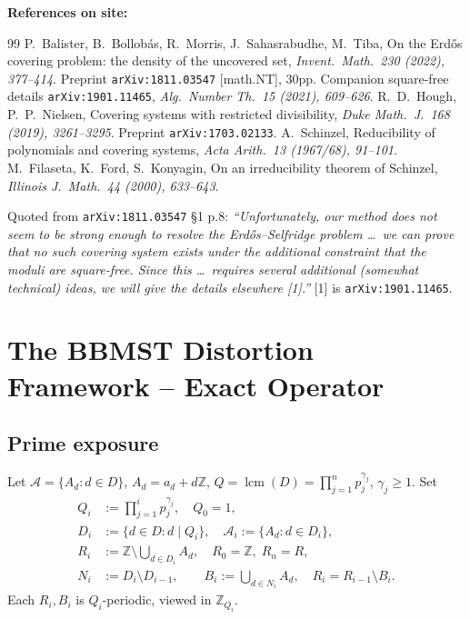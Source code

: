 \documentclass[11pt,a4paper]{article}
\theoremstyle{plain}
\theoremstyle{definition}
\theoremstyle{remark}
\newcommand{\Z}{\mathbb{Z}}
\newcommand{\calA}{\mathcal{A}}
\begin{document}
\noindent\textbf{References on site:}
\begin{thebibliography}{99}
 P.~Balister, B.~Bollob\'as, R.~Morris, J.~Sahasrabudhe, M.~Tiba, On the Erd\H{o}s covering problem: the density of the uncovered set, \textit{Invent.\ Math.\ 230 (2022), 377--414}. Preprint \texttt{arXiv:1811.03547} [math.NT], 30pp. Companion square-free details \texttt{arXiv:1901.11465}, \textit{Alg.\ Number Th.\ 15 (2021), 609--626}.
 R.~D.~Hough, P.~P.~Nielsen, Covering systems with restricted divisibility, \textit{Duke Math.\ J.\ 168 (2019), 3261--3295}. Preprint \texttt{arXiv:1703.02133}.
 A.~Schinzel, Reducibility of polynomials and covering systems, \textit{Acta Arith.\ 13 (1967/68), 91--101}.
 M.~Filaseta, K.~Ford, S.~Konyagin, On an irreducibility theorem of Schinzel, \textit{Illinois J.\ Math.\ 44 (2000), 633--643}.
\end{thebibliography}

Quoted from \texttt{arXiv:1811.03547} \S1 p.8: \emph{``Unfortunately, our method does not seem to be strong enough to resolve the Erd\H{o}s--Selfridge problem \dots\ we can prove that no such covering system exists under the additional constraint that the moduli are square-free. Since this \dots\ requires several additional (somewhat technical) ideas, we will give the details elsewhere [1].''}  [1] is \texttt{arXiv:1901.11465}.

\section{The BBMST Distortion Framework -- Exact Operator}

\subsection{Prime exposure}

Let $\calA=\{A_{d}:d\in D\}$, $A_{d}=a_{d}+d\Z$, $Q=\operatorname{lcm}(D)=\prod_{j=1}^{n}p_{j}^{\gamma_{j}}$, $\gamma_{j}\ge1$. Set
\begin{align*}
Q_{i}&:=\prod_{j=1}^{i}p_{j}^{\gamma_{j}},\quad Q_{0}=1,\\
D_{i}&:=\{d\in D:d\mid Q_{i}\},\quad \calA_{i}:=\{A_{d}:d\in D_{i}\},\\
R_{i}&:=\Z\setminus\bigcup_{d\in D_{i}}A_{d},\quad R_{0}=\Z,\;R_{n}=R,\\
N_{i}&:=D_{i}\setminus D_{i-1},\qquad B_{i}:=\bigcup_{d\in N_{i}}A_{d},\quad R_{i}=R_{i-1}\setminus B_{i}. \tag{1811.03547 (3)}
\end{align*}
Each $R_{i},B_{i}$ is $Q_{i}$-periodic, viewed in $\Z_{Q_{i}}$.
\end{document}
